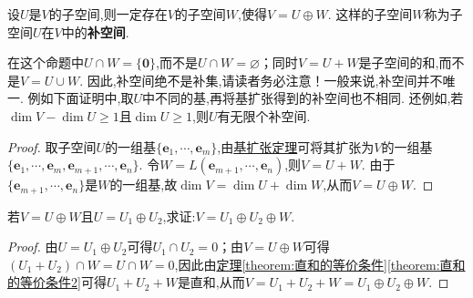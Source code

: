 \documentclass[lang=cn,newtx,10pt,scheme=chinese]{elegantbook}
\begin{document}
\begin{proposition}[任意子空间一定存在相应的补空间]\label{proposition:补空间}
设\(U\)是\(V\)的子空间,则一定存在\(V\)的子空间\(W\),使得\(V = U\oplus W\). 这样的子空间\(W\)称为子空间\(U\)在\(V\)中的\textbf{补空间}.
\end{proposition}
\begin{remark}
在这个命题中\(U\cap W = \{ \boldsymbol{0}\}\),而不是\(U\cap W=\varnothing\)；同时\(V = U + W\)是子空间的和,而不是\(V = U\cup W\). 因此,补空间绝不是补集,请读者务必注意！一般来说,补空间并不唯一. 例如下面证明中,取$U$中不同的基,再将基扩张得到的补空间也不相同.
还例如,若\(\dim V-\dim U\geq1\)且\(\dim U\geq1\),则\(U\)有无限个补空间.
\end{remark}
\begin{proof}
取子空间\(U\)的一组基\(\{\boldsymbol{e}_1,\cdots,\boldsymbol{e}_m\}\),由\hyperref[theorem:基扩充定理]{基扩张定理}可将其扩张为\(V\)的一组基\(\{\boldsymbol{e}_1,\cdots,\boldsymbol{e}_m,\boldsymbol{e}_{m + 1},\cdots,\boldsymbol{e}_n\}\). 令\(W = L(\boldsymbol{e}_{m + 1},\cdots,\boldsymbol{e}_n)\),则\(V = U+W\). 由于\(\{\boldsymbol{e}_{m + 1},\cdots,\boldsymbol{e}_n\}\)是\(W\)的一组基,故\(\dim V=\dim U+\dim W\),从而\(V = U\oplus W\). 
\end{proof}

\begin{proposition}\label{proposition:直和的传递性}
若\(V = U\oplus W\)且\(U = U_1\oplus U_2\),求证:\(V = U_1\oplus U_2\oplus W\). 
\end{proposition}
\begin{proof}
由\(U = U_1\oplus U_2\)可得\(U_1\cap U_2 = 0\)；由\(V = U\oplus W\)可得\((U_1 + U_2)\cap W=U\cap W = 0\),因此由\hyperref[theorem:直和的等价条件2]{定理\ref{theorem:直和的等价条件}\ref{theorem:直和的等价条件2}}可得\(U_1 + U_2+W\)是直和,从而\(V = U_1 + U_2+W = U_1\oplus U_2\oplus W\).
\end{proof}
\end{document}
